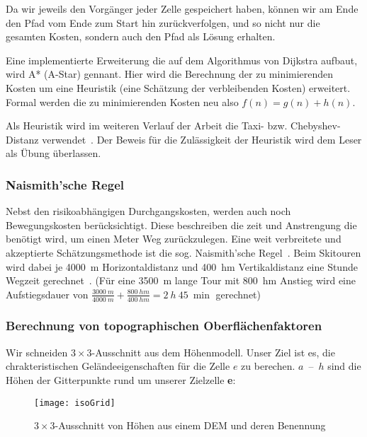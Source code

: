 \begin{multicols}{2}
Da wir jeweils den Vorgänger jeder Zelle gespeichert haben, können wir am Ende den Pfad vom Ende zum Start hin zurückverfolgen, und so nicht nur die gesamten Kosten, sondern auch den Pfad als Lösung erhalten.

Eine implementierte Erweiterung die auf dem Algorithmus von Dijkstra aufbaut, wird A* (A-Star) gennant. Hier wird die Berechnung der zu minimierenden Kosten um eine Heuristik (eine Schätzung der verbleibenden Kosten) erweitert. Formal werden die zu minimierenden Kosten neu also $f(n)=g(n)+h(n)$.~\cite{Hart1968}

Als Heuristik wird im weiteren Verlauf der Arbeit die Taxi- bzw. Chebyshev-Distanz verwendet~\cite{cantrell2000modern}. Der Beweis für die Zulässigkeit der Heuristik wird dem Leser als Übung überlassen. 

\subsubsection{Naismith'sche Regel}

Nebst den risikoabhängigen Durchgangskosten, werden auch noch Bewegungskosten berücksichtigt. Diese beschreiben die zeit und Anstrengung die benötigt wird, um einen Meter Weg zurückzulegen. Eine weit verbreitete und akzeptierte Schätzungsmethode ist die sog. Naismith'sche Regel~\cite{naismithsrule}.
Beim Skitouren wird dabei je \qty{4000}{m} Horizontaldistanz und \qty{400}{hm} Vertikaldistanz eine Stunde Wegzeit gerechnet~\cite{sacbergspwinter}\cite{naismithsrule}. (Für eine \qty{3500}{m} lange Tour mit \qty{800}{hm} Anstieg wird eine Aufstiegsdauer von $\frac{\qty{3000}{m}}{\qty{4000}{m}} + \frac{\qty{800}{hm}}{\qty{400}{hm}} = \qty{2}{h}\ \qty{45}{\min}$ gerechnet)


\subsubsection{Berechnung von topographischen Oberflächenfaktoren}

Wir schneiden $3 \times 3$-Ausschnitt aus dem Höhenmodell. Unser Ziel ist es, die chrakteristischen Geländeeigenschaften für die Zelle $e$ zu berechen.
$a$~--~$h$ sind die Höhen der Gitterpunkte rund um unserer Zielzelle \textbf{e}:

\begin{figure}[H]
  \centering
  \texttt{[image: isoGrid]}
  \caption{$3 \times 3$-Ausschnitt von Höhen aus einem DEM und deren Benennung}
\end{figure}


\end{multicols}
